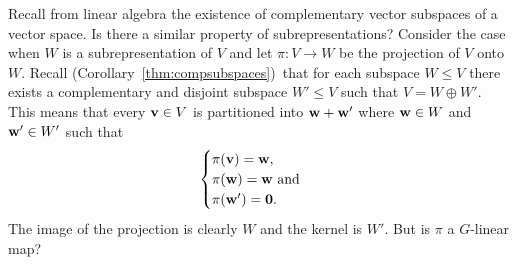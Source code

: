 Recall from linear algebra the existence of complementary vector subspaces of a vector space. Is there a similar property of subrepresentations? Consider the case when $W$ is a subrepresentation of $V$ and let $\pi: V \rightarrow W$ be the projection of $V$ onto $W$. Recall (Corollary~\ref{thm:compsubspaces})~that for each subspace $W\leq V$ there exists a complementary and disjoint subspace $W' \leq V$ such that $V = W \oplus W'$. This means that every $\mathbf{v} \in V$ is partitioned into $\mathbf{w} + \mathbf{w}'$ where $\mathbf{w} \in W$ and $\mathbf{w}' \in W'$ such that 
\begin{align*}
	\begin{cases}
		\pi(\mathbf{v}) = \mathbf{w}, \\
		\pi(\mathbf{w}) = \mathbf{w} \text{ and } \\
		\pi(\mathbf{w}') = \mathbf{0}.
	\end{cases}
\end{align*}
The image of the projection is clearly $W$ and the kernel is $W'$. But is $\pi$ a $G$-linear map?

